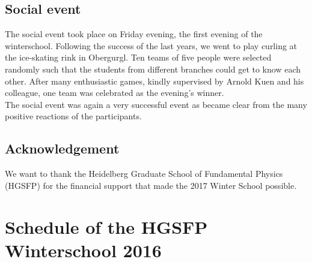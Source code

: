 \documentclass[11pt,a4paper]{article}
\numberwithin{equation}{section}
\numberwithin{table}{section}\setlength{\multlinegap}{25pt}
\begin{document}
\subsection*{Social event}
The social event took place on Friday evening, the first evening of the winterschool. Following the success of the last years, we went to play curling at the ice-skating rink in Obergurgl. Ten teams of five people were selected randomly such that the students from different branches could get to know each other. After many enthusiastic games, kindly supervised by Arnold Kuen and his colleague, one team was celebrated as the evening's winner.\\ The social event was again a very successful event as became clear from the many positive reactions of the participants.
%
%
%

\subsection*{Acknowledgement}

\noindent We want to thank the Heidelberg Graduate School of Fundamental Physics (HGSFP) for the financial support that made the 2017 Winter School possible.

\section{Schedule of the HGSFP Winterschool 2016}
\end{document}
